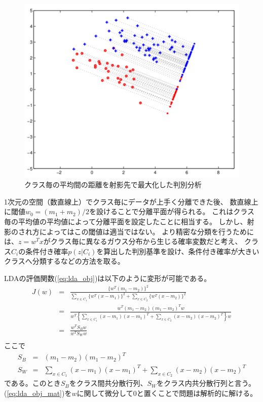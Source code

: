 \begin{figure}
    \centering
    \includegraphics[width=12cm]{images/var_dis.png}
    \caption{クラス毎の平均間の距離を射影先で最大化した判別分析}
    \label{fig:var_dis}
\end{figure}

1次元の空間（数直線上）でクラス毎にデータが上手く分離できた後、
数直線上に閾値\(w_0=(m_1+m_2)/2\)を設けることで分離平面が得られる。
これはクラス毎の平均値の平均値によって分離平面を設定したことに相当する。
しかし、射影のされ方によってはこの閾値は適当ではない。
より精密な分類を行うためには、\(z=w^Tx\)がクラス毎に異なるガウス分布から生じる確率変数だと考え、
クラス\(C_i\)の条件付き確率\(p(z|C_i)\)を算出した判別基準を設け、条件付き確率が大きいクラスへ分類するなどの方法を取る。

LDAの評価関数(\ref{eq:lda_obj})は以下のように変形が可能である。
\begin{eqnarray}
    \label{eq:lda_obj_mat}
    J(w) 
    & = & \frac{\{w^T(m_1-m_2)\}^2}{\sum_{x\in C_1}\{w^T(x-m_1)\}^2 + \sum_{x\in C_2}\{w^T(x-m_2)\}^2} \nonumber \\
    & = & \frac{w^T(m_1-m_2)(m_1-m_2)^Tw} {w^T\left\{ \sum_{x\in C_1} (x-m_1)(x-m_1)^T + \sum_{x\in C_2} (x-m_2)(x-m_2)^T \right\}w} \nonumber \\
    & = & \frac{w^TS_Bw} {w^TS_Ww} \\
    \nonumber 
\end{eqnarray}
ここで
\begin{eqnarray}
    S_B &=& (m_1-m_2)(m_1-m_2)^T \\
    S_W &=& \sum_{x\in C_1} (x-m_1)(x-m_1)^T + \sum_{x\in C_2} (x-m_2)(x-m_2)^T
\end{eqnarray}
である。このとき\(S_B\)をクラス間共分散行列、\(S_W\)をクラス内共分散行列と言う。
(\ref{eq:lda_obj_mat})を\(w\)に関して微分して\(0\)と置くことで問題は解析的に解ける。

